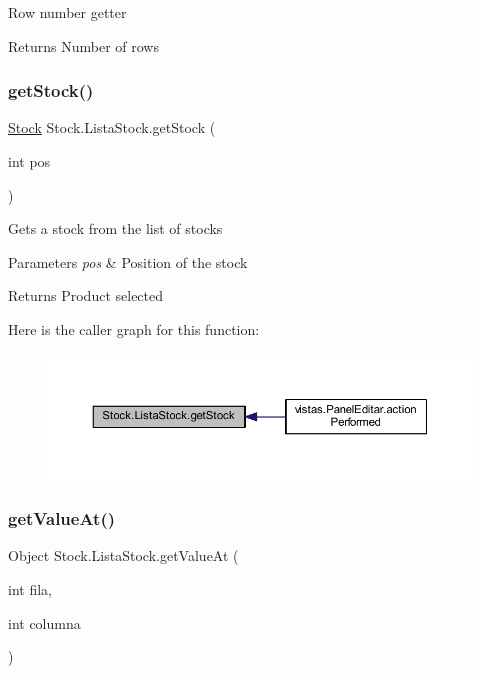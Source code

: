 Row number getter \begin{DoxyReturn}{Returns}
Number of rows 
\end{DoxyReturn}
\mbox{\label{class_stock_1_1_lista_stock_a17681900b9bdf6909a15c61b4946d080}} 
\subsubsection{\texorpdfstring{get\+Stock()}{getStock()}}
{\footnotesize\ttfamily \mbox{\hyperlink{class_stock_1_1_stock}{Stock}} Stock.\+Lista\+Stock.\+get\+Stock (\begin{DoxyParamCaption}\item[{int}]{pos }\end{DoxyParamCaption})}

Gets a stock from the list of stocks 
\begin{DoxyParams}{Parameters}
{\em pos} & Position of the stock \\
\hline
\end{DoxyParams}
\begin{DoxyReturn}{Returns}
Product selected 
\end{DoxyReturn}
Here is the caller graph for this function\+:
\nopagebreak
\begin{figure}[H]
\begin{center}
\leavevmode
\includegraphics[width=350pt]{class_stock_1_1_lista_stock_a17681900b9bdf6909a15c61b4946d080_icgraph}
\end{center}
\end{figure}
\mbox{\label{class_stock_1_1_lista_stock_ac181755caf0025ec10ae230927bb457f}} 
\subsubsection{\texorpdfstring{get\+Value\+At()}{getValueAt()}}
{\footnotesize\ttfamily Object Stock.\+Lista\+Stock.\+get\+Value\+At (\begin{DoxyParamCaption}\item[{int}]{fila,  }\item[{int}]{columna }\end{DoxyParamCaption})}

